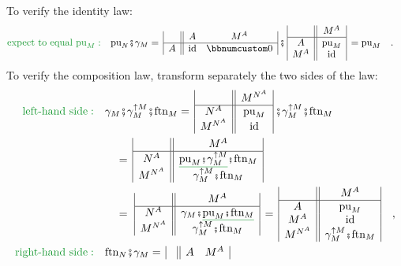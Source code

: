 To verify the identity law:
\begin{align*}
{\color{greenunder}\text{expect to equal }\text{pu}_{M}:}\quad & \text{pu}_{N}\bef\gamma_{M}=\,\begin{array}{|c||cc|}
 & A & M^{A}\\
\hline A & \text{id} & \bbnum 0
\end{array}\,\bef\,\begin{array}{|c||c|}
 & M^{A}\\
\hline A & \text{pu}_{M}\\
M^{A} & \text{id}
\end{array}\,=\text{pu}_{M}\quad.
\end{align*}
To verify the composition law, transform separately the two sides
of the law:
\begin{align*}
{\color{greenunder}\text{left-hand side}:}\quad & \gamma_{M}\bef\gamma_{M}^{\uparrow M}\bef\text{ftn}_{M}=\,\begin{array}{|c||c|}
 & M^{N^{A}}\\
\hline N^{A} & \text{pu}_{M}\\
M^{N^{A}} & \text{id}
\end{array}\,\bef\gamma_{M}^{\uparrow M}\bef\text{ftn}_{M}\\
 & \quad=\,\begin{array}{|c||c|}
 & M^{A}\\
\hline N^{A} & \gunderline{\text{pu}_{M}\bef\gamma_{M}^{\uparrow M}}\bef\text{ftn}_{M}\\
M^{N^{A}} & \gamma_{M}^{\uparrow M}\bef\text{ftn}_{M}
\end{array}\\
 & \quad=\,\,\begin{array}{|c||c|}
 & M^{A}\\
\hline N^{A} & \gamma_{M}\bef\gunderline{\text{pu}_{M}\bef\text{ftn}_{M}}\\
M^{N^{A}} & \gamma_{M}^{\uparrow M}\bef\text{ftn}_{M}
\end{array}\,=\,\begin{array}{|c||c|}
 & M^{A}\\
\hline A & \text{pu}_{M}\\
M^{A} & \text{id}\\
M^{N^{A}} & \gamma_{M}^{\uparrow M}\bef\text{ftn}_{M}
\end{array}\quad,\\
{\color{greenunder}\text{right-hand side}:}\quad & \text{ftn}_{N}\bef\gamma_{M}=\,\begin{array}{|c||cc|}
 & A & M^{A}\\

\end{array}
\end{align*}

